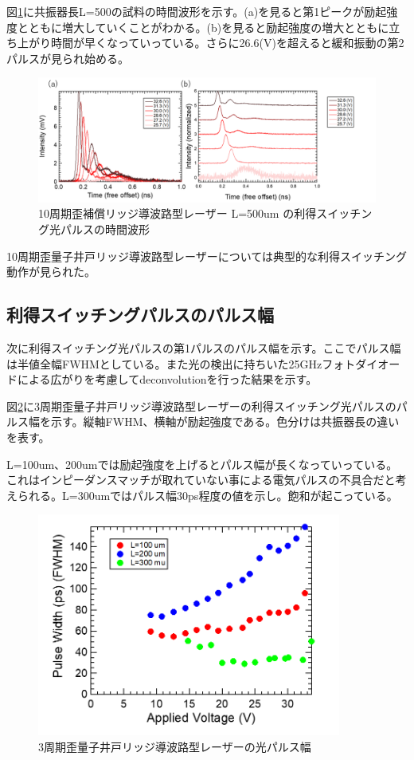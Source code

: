 {%
図\ref{fig:fig_3_2_10QW_ridge_L500_GS}に共振器長L=500の試料の時間波形を示す。(a)を見ると第1ピークが励起強度とともに増大していくことがわかる。(b)を見ると励起強度の増大とともに立ち上がり時間が早くなっていっている。さらに26.6(V)を超えると緩和振動の第2パルスが見られ始める。
\begin{figure}[h]
	\centering
	\includegraphics[width=15cm]{figure/fig_3_2_10QW_ridge_L500_GS.png}
		\caption{10周期歪補償リッジ導波路型レーザー L=500um の利得スイッチング光パルスの時間波形}
		\label{fig:fig_3_2_10QW_ridge_L500_GS}
\end{figure}

\newpage
10周期歪量子井戸リッジ導波路型レーザーについては典型的な利得スイッチング動作が見られた。
\clearpage
\subsection{利得スイッチングパルスのパルス幅}%
次に利得スイッチング光パルスの第1パルスのパルス幅を示す。ここでパルス幅は半値全幅FWHMとしている。また光の検出に持ちいた25GHzフォトダイオードによる広がりを考慮してdeconvolutionを行った結果を示す。

図\ref{fig:fig_3_2_3QW_ridge_GS_FWHM}に3周期歪量子井戸リッジ導波路型レーザーの利得スイッチング光パルスのパルス幅を示す。縦軸FWHM、横軸が励起強度である。色分けは共振器長の違いを表す。

L=100um、200umでは励起強度を上げるとパルス幅が長くなっていっている。これはインピーダンスマッチが取れていない事による電気パルスの不具合だと考えられる。L=300umではパルス幅30ps程度の値を示し。飽和が起こっている。
\begin{figure}[h]
	\centering
	\includegraphics[width=10cm]{figure/fig_3_2_3QW_ridge_GS_FWHM.png}
		\caption{3周期歪量子井戸リッジ導波路型レーザーの光パルス幅}
		\label{fig:fig_3_2_3QW_ridge_GS_FWHM}
\end{figure}


}

